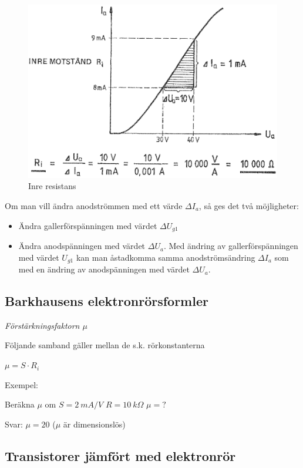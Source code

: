 \begin{figure}[h]
\includegraphics[width=\textwidth]{images/cropped_pdfs/bild_2_2-34.pdf}
\caption{Inre resistans}
\label{fig:BildII2-34}
\end{figure}

Om man vill ändra anodströmmen med ett värde \(\Delta I_a\), så ges det två
möjligheter:
\begin{itemize}
\item Ändra gallerförspänningen med värdet \(\Delta U_{g1}\)
\item Ändra anodspänningen med värdet \(\Delta U_a\).
  Med ändring av gallerförspänningen med värdet \(U_{g1}\) kan man åstadkomma
  samma anodströmsändring \(\Delta I_a\) som med en ändring av anodspänningen
  med värdet \(\Delta U_a\).
\end{itemize}

\subsection{Barkhausens elektronrörsformler}

\emph{Förstärkningsfaktorn \(\mu \)}

Följande samband gäller mellan de s.k. rörkonstanterna

\(\mu = S \cdot R_i\)

Exempel:

Beräkna \(\mu\)  om \(S = 2\ mA/V\) \(R = 10\ k\Omega\) \(\mu = ?\)

Svar: \(\mu = 20\) (\(\mu\)  är dimensionslös)

\subsection{Transistorer jämfört med elektronrör}

